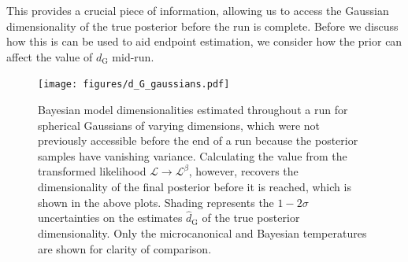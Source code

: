 \documentclass[usenatbib]{mnras}
\newcommand{\Like}{\mathcal{L}}
\newcommand{\dG}{d_\mathrm{G}}
\begin{document}
\par
This provides a crucial piece of information, allowing us to access the Gaussian dimensionality of the true posterior before the run is complete. Before we discuss how this is can be used to aid endpoint estimation, we consider how the prior can affect the value of $\dG$ mid-run.  
\begin{figure}
\begin{center}
    \texttt{[image: figures/d\_G\_gaussians.pdf]}
\end{center}
\caption{Bayesian model dimensionalities estimated throughout a run for spherical Gaussians of varying dimensions, which were not previously accessible before the end of a run because the posterior samples have vanishing variance. Calculating the value from the transformed likelihood $\Like \to \Like^{\beta}$, however, recovers the dimensionality of the final posterior before it is reached, which is shown in the above plots. Shading represents the $1-2\sigma$ uncertainties on the estimates $\hat{d}_\mathrm{G}$ of the true posterior dimensionality. Only the microcanonical and Bayesian temperatures are shown for clarity of comparison.}
\label{fig:d_G_gaussians}
\end{figure}
\end{document}
